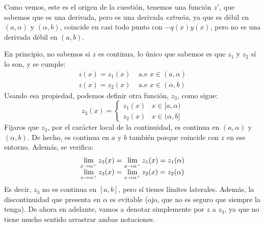Como vemos, este es el origen de la cuestión, tenemos una función $z'$, que sabemos que es una derivada, pero es una derivada \textit{extraña}, ya que es débil en $(a,\alpha)$ y $(\alpha,b)$, coincide en casi todo punto con $-q(x)y(x)$, pero no es una derivada débil en $(a,b)$. 

En principio, no sabemos si $z$ es continua, lo único que sabemos es que $z_1$ y $z_2$ sí lo son, y se cumple:
\[
\begin{array}{cc}
z(x)=z_1(x) & \text{ a.e } x\in(a,\alpha) \\
z(x)=z_2(x) & \text{ a.e } x\in(\alpha,b)
\end{array}
\]
Usando esa propiedad, podemos definir otra función, $z_3$, como sigue:
\[
z_3(x)=\left\{
\begin{array}{cc}
z_1(x) & x\in[a,\alpha) \\
z_2(x) & x\in(\alpha,b]
\end{array}
\right.
\]
Fijaros que $z_3$, por el carácter local de la continuidad, es continua en $(a,\alpha)$ y $(\alpha,b)$. De hecho, es continua en $a$ y $b$ también porque coincide con $z$ en ese entorno. Además, se verifica:
\[
\begin{array}{c}
\displaystyle\lim_{ x \to \alpha^- } z_3(x)=\displaystyle\lim_{ x \to \alpha^- } z_1(x)=z_1(\alpha)\\
\displaystyle\lim_{ x \to \alpha^+ } z_3(x)=\displaystyle\lim_{ x \to \alpha^+ } z_2(x)=z_2(\alpha)
\end{array}
\]
Es decir, $z_3$ no es continua en $[a,b]$, pero sí tienes límites laterales. Además, la discontinuidad que presenta en $\alpha$ es evitable (ojo, que no es seguro que siempre la tenga). De ahora en adelante, vamos a denotar simplemente por $z$ a $z_3$, ya que no tiene mucho sentido arrastrar ambas notaciones. 

